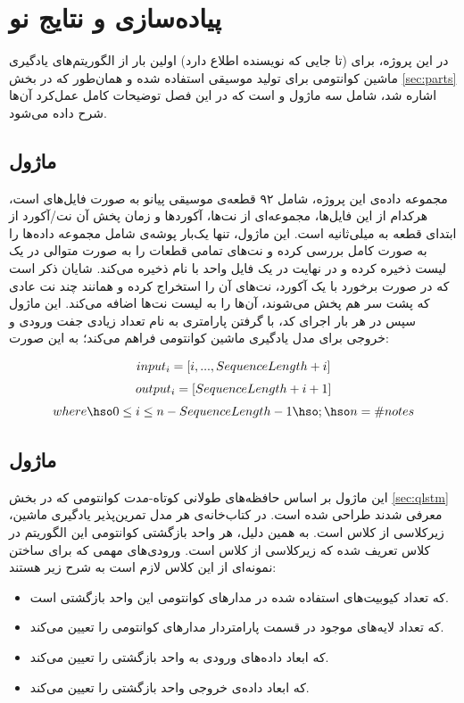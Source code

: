 \chapter{پیاده‌سازی و نتایج نو}

در این پروژه، برای (تا جایی که نویسنده اطلاع دارد) اولین بار از الگوریتم‌های یادگیری ماشین کوانتومی برای تولید موسیقی استفاده شده و همان‌طور که در بخش
\ref{sec:parts}
اشاره شد، شامل سه ماژول 
و
است که در این فصل توضیحات کامل عمل‌کرد آن‌ها شرح داده می‌شود.

\section{ماژول 
}
مجموعه داده‌ی این پروژه، شامل ۹۲ قطعه‌ی موسیقی پیانو به صورت فایل‌های 
است، هرکدام از این فایل‌ها، مجموعه‌ای از نت‌ها، آکوردها و زمان پخش آن نت/آکورد از ابتدای قطعه به میلی‌ثانیه است.
این ماژول، تنها یک‌بار پوشه‌ی شامل مجموعه داده‌ها را به صورت کامل بررسی کرده و نت‌های تمامی قطعات را به صورت متوالی در یک لیست ذخیره کرده و در نهایت در یک فایل واحد با نام
ذخیره می‌کند. شایان ذکر است که در صورت برخورد با یک آکورد، نت‌های آن را استخراج کرده و همانند چند نت عادی که پشت سر هم پخش می‌شوند، آن‌ها را به لیست نت‌ها اضافه می‌کند.
این ماژول سپس در هر بار اجرای کد، با گرفتن پارامتری به نام
تعداد زیادی جفت ورودی و خروجی برای مدل یادگیری ماشین کوانتومی فراهم می‌کند؛ به این صورت:

\begin{equation}
    \begin{gathered}
    input_i = [i, ..., SequenceLength + i] \\[3pt]
    output_i = [SequenceLength + i + 1] \\[3pt]
    where \hso 0 \leq i \leq n - SequenceLength - 1 \hso ; \hso n = \#notes
    \end{gathered}
\end{equation}

\section{ماژول
} 
این ماژول بر اساس حافظه‌های طولانی کوتاه-مدت کوانتومی که در بخش
\ref{sec:qlstm}
معرفی شدند طراحی شده است.
در کتاب‌خانه‌ی 
هر مدل تمرین‌پذیر یادگیری ماشین، زیرکلاسی از کلاس
است. به همین دلیل، هر واحد بازگشتی کوانتومی این الگوریتم در کلاس
تعریف شده که زیرکلاسی از کلاس 
است.
ورودی‌های مهمی که برای ساختن نمونه‌ای از این کلاس لازم است به شرح زیر هستند:
\begin{itemize}
    \item 
    که تعداد کیوبیت‌های استفاده شده در مدارهای کوانتومی این واحد بازگشتی است.
    \item
    که تعداد لایه‌های موجود در قسمت پارامتردار مدارهای کوانتومی را تعیین می‌کند.
    \item
    که ابعاد داده‌های ورودی به واحد بازگشتی را تعیین می‌کند.
    \item
    که ابعاد داده‌ی خروجی واحد بازگشتی را تعیین می‌کند.
\end{itemize}
